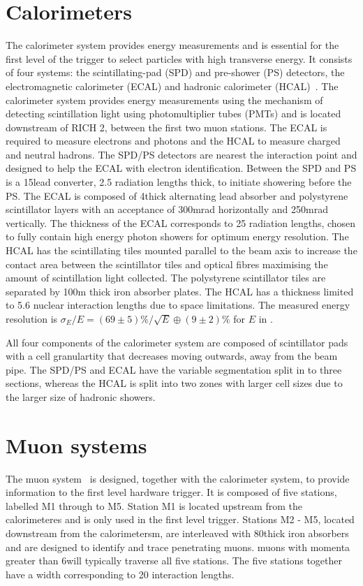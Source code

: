 \section{Calorimeters}

The calorimeter system provides energy measurements and is essential for the first level of the trigger to select particles with high transverse energy. It consists of four systems: the scintillating-pad (SPD) and pre-shower (PS) detectors, the electromagnetic calorimeter (ECAL) and hadronic calorimeter (HCAL)~\cite{LHCb-DP-2013-004}. The calorimeter system provides energy measurements using the mechanism of detecting scintillation light using photomultiplier tubes (PMTs) and is located downstream of RICH 2, between the first two muon stations. The ECAL is required to measure electrons and photons and the HCAL to measure charged and neutral hadrons.  The SPD/PS detectors are nearest the interaction point and designed to help the ECAL with electron identification. Between the SPD and PS is a 15\mm lead converter, 2.5 radiation lengths thick, to initiate showering before the PS. The ECAL is composed of 4\mm thick alternating lead absorber and polystyrene scintillator layers with an acceptance of 300mrad horizontally and 250mrad vertically. The thickness of the ECAL corresponds to 25 radiation lengths, chosen to fully contain high energy photon showers for optimum energy resolution. The HCAL has the scintillating tiles mounted parallel to the beam axis to increase the contact area between the scintillator tiles and optical fibres maximising the amount of scintillation light collected. The polystyrene scintillator tiles are separated by 100m thick iron absorber plates. The HCAL has a thickness limited to 5.6 nuclear interaction lengths due to space limitations. The measured energy resolution is $\sigma_E/E = (69 \pm 5)\%/\sqrt{E} \oplus (9 \pm 2)\%$ for $E$ in \gev.

All four components of the calorimeter system are composed of scintillator pads with a cell granulartity that decreases moving outwards, away from the beam pipe. The SPD/PS and ECAL have the variable segmentation split in to three sections, whereas the HCAL is split into two zones with larger cell sizes due to the larger size of hadronic showers.

\section{Muon systems}
\label{sec:detector:muon}

The muon system~\cite{LHCb-DP-2013-001,LHCb-DP-2012-002} is designed, together with the calorimeter system, to provide information to the first level hardware trigger. It is composed of five stations, labelled M1 through to M5. Station M1 is located upstream from the calorimeteres and is only used in the first level trigger. Stations M2 - M5, located downstream from the calorimetersm, are interleaved with 80\cm thick iron absorbers and are designed to identify and trace penetrating muons. muons with momenta greater than 6\gevc will typically traverse all five stations. The five stations together have a width corresponding to 20 interaction lengths. 


